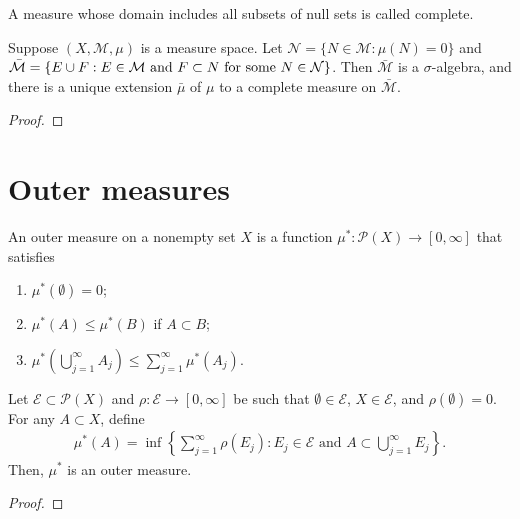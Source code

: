 \begin{definition}
A measure whose domain includes all subsets of null sets is called complete.
\end{definition}

\begin{theorem}
Suppose $(X, \mathcal{M}, \mu)$ is a measure space.
Let $\mathcal{N} = \{ N \in \mathcal{M}: \mu(N) = 0 \}$ and $\Bar{\mathcal{M}} = \{ E \cup F: E \in \mathcal{M} \text{ and } F \subset N \text{ for some } N \in \mathcal{N} \}$.
Then $\bar{\mathcal{M}}$ is a $\sigma$-algebra, and there is a unique extension $\bar{\mu}$ of $\mu$ to a complete measure on $\bar{\mathcal{M}}$.
\end{theorem}

\begin{proof}
    
\end{proof}

\section{Outer measures}

\begin{definition}
An outer measure on a nonempty set $X$ is a function $\mu^*: \mathcal{P}(X) \to [0, \infty]$ that satisfies
\begin{enumerate}
    \item $\mu^*(\emptyset) = 0$;
    \item $\mu^*(A) \le \mu^*(B)$ if $A \subset B$;
    \item $\mu^*(\bigcup_{j=1}^{\infty} A_j) \le \sum_{j=1}^{\infty} \mu^*(A_j)$.
\end{enumerate}
\end{definition}

\begin{proposition}
Let $\mathcal{E} \subset \mathcal{P}(X)$ and $\rho : \mathcal{E} \to [0, \infty]$ be such that $\emptyset \in \mathcal{E}$, $X \in \mathcal{E}$, and $\rho(\emptyset) = 0$.
For any $A \subset X$, define
\begin{align}
\mu^*(A) = \inf \left\{ \sum_{j=1}^{\infty} \rho(E_j): E_j \in \mathcal{E} \text{ and } A \subset \bigcup _{j=1}^{\infty} E_j \right\}.
\end{align}
Then, $\mu^*$ is an outer measure.
\end{proposition}

\begin{proof}

\end{proof}

\begin{theorem}
\end{theorem}

\begin{definition}[Premeasure]
\end{definition}